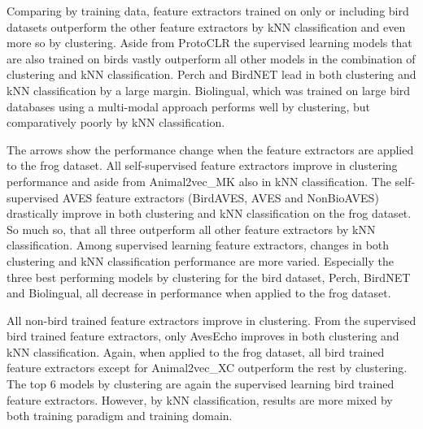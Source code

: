 Comparing by training data, feature extractors trained on only or including bird datasets outperform the other feature extractors by kNN classification and even more so by clustering.
Aside from ProtoCLR the supervised learning models that are also trained on birds vastly outperform all other models in the combination of clustering and kNN classification.
Perch and BirdNET lead in both clustering and kNN classification by a large margin.
Biolingual, which was trained on large bird databases using a multi-modal approach performs well by clustering, but comparatively poorly by kNN classification.

The arrows show the performance change when the feature extractors are applied to the frog dataset.
All self-supervised feature extractors improve in clustering performance and aside from Animal2vec\_MK also in kNN classification.
The self-supervised AVES feature extractors (BirdAVES, AVES and NonBioAVES) drastically improve in both clustering and kNN classification on the frog dataset.
So much so, that all three outperform all other feature extractors by kNN classification.
Among supervised learning feature extractors, changes in both clustering and kNN classification performance are more varied.
Especially the three best performing models by clustering for the bird dataset, Perch, BirdNET and Biolingual, all decrease in performance when applied to the frog dataset.

All non-bird trained feature extractors improve in clustering.
From the supervised bird trained feature extractors, only AvesEcho improves in both clustering and kNN classification.
Again, when applied to the frog dataset, all bird trained feature extractors except for Animal2vec\_XC outperform the rest by clustering.
The top 6 models by clustering are again the supervised learning bird trained feature extractors.
However, by kNN classification, results are more mixed by both training paradigm and training domain.

    



